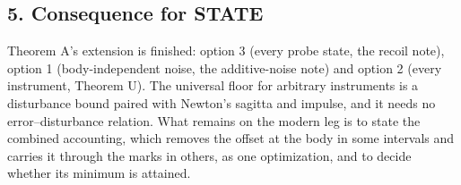 \documentclass[11pt,a4paper]{article}
\begin{document}
\hypertarget{consequence-for-state}{%
\subsection{5. Consequence for STATE}\label{consequence-for-state}}

Theorem A's extension is finished: option 3 (every probe state, the
recoil note), option 1 (body-independent noise, the additive-noise note)
and option 2 (every instrument, Theorem U). The universal floor for
arbitrary instruments is a disturbance bound paired with Newton's
sagitta and impulse, and it needs no error--disturbance relation. What
remains on the modern leg is to state the combined accounting, which
removes the offset at the body in some intervals and carries it through
the marks in others, as one optimization, and to decide whether its
minimum is attained.
\end{document}
